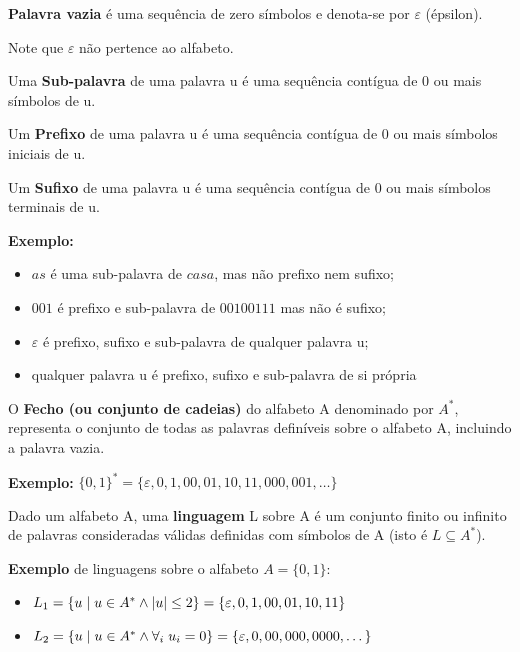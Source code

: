 \documentclass{article}
\begin{document}
\begin{flushleft}
  \item \textbf{Palavra vazia}  é uma sequência de zero símbolos e
  denota-se por $\varepsilon $ (épsilon).
  \item Note que $\varepsilon$ não pertence ao alfabeto.
  \item Uma \textbf{Sub-palavra} de uma palavra u é uma sequência
  contígua de 0 ou mais símbolos de u.
  \item Um \textbf{Prefixo} de uma palavra u é uma sequência contígua
  de 0 ou mais símbolos iniciais de u.
  \item Um \textbf{Sufixo} de uma palavra u é uma sequência contígua de
  0 ou mais símbolos terminais de u.
  \item \textbf{Exemplo:}
  \begin{itemize}
    \item $as$ é uma sub-palavra de $casa$, mas não prefixo nem sufixo;
    \item $001$ é prefixo e sub-palavra de $00100111$ mas não é sufixo;
    \item $\varepsilon$ é prefixo, sufixo e sub-palavra de qualquer palavra u;
    \item qualquer palavra u é prefixo, sufixo e sub-palavra de si
    própria
  \end{itemize}
  \item O \textbf{Fecho (ou conjunto de cadeias)} do alfabeto A
  denominado por $A^*$, representa o conjunto de todas as
  palavras definíveis sobre o alfabeto A, incluindo a palavra
  vazia.
  \item \textbf{Exemplo:} $\{0,1\}^* = \{\varepsilon,0,1,00,01,10,11,000,001,\dots\}$
  \item Dado um alfabeto A, uma \textbf{linguagem} L sobre A é um
  conjunto finito ou infinito de palavras consideradas válidas
  definidas com símbolos de A (isto é $L \subseteq A^*$).
  \item \textbf{Exemplo} de linguagens sobre o alfabeto $A = \{0,1\}$:
  \begin{itemize}
    \item $L_1 = \{u \hspace{1mm} | \hspace{1mm} u \in A^* \wedge |u| \le 2\} = \{\varepsilon, 0,1,00,01,10,11\}$
    \item $L_2 = \{u \hspace{1mm} | \hspace{1mm} u \in A^* \wedge \forall_i \hspace{1mm} u_i = 0\} = \{\varepsilon, 0, 00, 000, 0000, \dots\}$

\end{itemize}
\end{flushleft}
\end{document}
